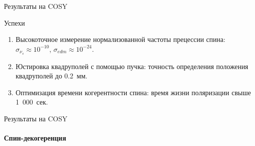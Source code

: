 \documentclass[14pt]{beamer}
\begin{document}
\begin{frame}{Результаты на COSY}
	\begin{block}{Успехи}
		\begin{enumerate}
			\item Высокоточное измерение нормализованной частоты прецессии спина: $\sigma_{\nu_s}\approx 10^{-10}$, $\sigma_{edm}\approx 10^{-24}$\ecm.
			\item Юстировка квадруполей с помощью пучка: точность определения положения квадруполей до 0.2~мм.
			\item Оптимизация времени когерентности спина: время жизни поляризации свыше 1~000~сек.
		\end{enumerate}
	\end{block}
\end{frame}
\begin{frame}{Результаты на COSY}
	\framesubtitle{Спин-декогеренция}
	\centering
\end{frame}
\end{document}
